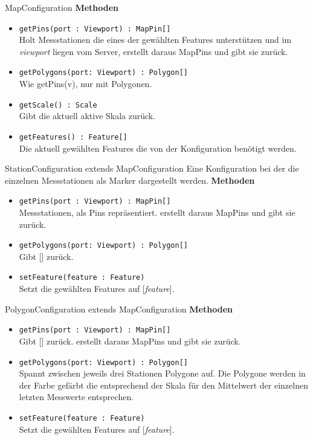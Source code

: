 \begin{Class}{MapConfiguration}
    \textbf{Methoden}
    \begin{itemize}
        \item \texttt{getPins(port : Viewport) : MapPin[]}
        \\ Holt Messstationen die eines der gewählten Features unterstützen und im \emph{viewport} liegen vom Server,
        erstellt daraus MapPins und gibt sie zurück.
        \item \texttt{getPolygons(port: Viewport) : Polygon[]}
        \\ Wie getPins(v), nur mit Polygonen. 
        \item \texttt{getScale() : Scale}
        \\ Gibt die aktuell aktive Skala zurück.
        \item \texttt{getFeatures() : Feature[]}
        \\ Die aktuell gewählten Features die von der Konfiguration benötigt werden.
    \end{itemize}
\end{Class}

\begin{Class}{StationConfiguration extends MapConfiguration}
    Eine Konfiguration bei der die einzelnen Messstationen als Marker dargestellt werden.
    \textbf{Methoden}
    \begin{itemize}
        \item \texttt{getPins(port : Viewport) : MapPin[]}
        \\ Messstationen, als Pins repräsentiert.
        erstellt daraus MapPins und gibt sie zurück.
        \item \texttt{getPolygons(port: Viewport) : Polygon[]}
        \\ Gibt [] zurück.
        \bigskip
        \item \texttt{setFeature(feature : Feature)}
        \\ Setzt die gewählten Features auf [\emph{feature}].
    \end{itemize}
\end{Class}

\begin{Class}{PolygonConfiguration extends MapConfiguration}
    \textbf{Methoden}
    \begin{itemize}
        \item \texttt{getPins(port : Viewport) : MapPin[]}
        \\ Gibt [] zurück.
        erstellt daraus MapPins und gibt sie zurück.
        \item \texttt{getPolygons(port: Viewport) : Polygon[]}
        \\ Spannt zwischen jeweils drei Stationen Polygone auf.
        Die Polygone werden in der Farbe gefärbt die entsprechend der Skala für den Mittelwert der einzelnen letzten Messwerte entsprechen.
        \bigskip
        \item \texttt{setFeature(feature : Feature)}
        \\ Setzt die gewählten Features auf [\emph{feature}].
    \end{itemize}
\end{Class}

